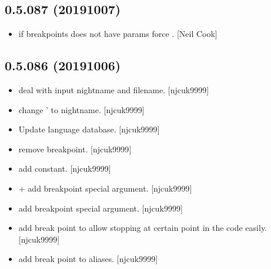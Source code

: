 \documentclass[a4paper,10pt,english]{report}
\begin{document}
\subsection{0.5.087 (2019\sphinxhyphen{}10\sphinxhyphen{}07)}
\label{\detokenize{misc/changelog:id75}}\begin{itemize}
\item {} 
 \sphinxhyphen{} if breakpoints does not have
params force . {[}Neil Cook{]}

\end{itemize}


\subsection{0.5.086 (2019\sphinxhyphen{}10\sphinxhyphen{}06)}
\label{\detokenize{misc/changelog:id76}}\begin{itemize}
\item {} 
 \sphinxhyphen{} deal with input nightname and
filename. {[}njcuk9999{]}

\item {} 
 \sphinxhyphen{} change ’ to nightname. {[}njcuk9999{]}

\item {} 
Update language database. {[}njcuk9999{]}

\item {} 
 \sphinxhyphen{} remove breakpoint. {[}njcuk9999{]}

\item {} 
 \sphinxhyphen{} add 
constant. {[}njcuk9999{]}

\item {} 
 +  \sphinxhyphen{} add breakpoint special
argument. {[}njcuk9999{]}

\item {} 
 \sphinxhyphen{} add breakpoint special argument.
{[}njcuk9999{]}

\item {} 
 \sphinxhyphen{} add break point to allow
stopping at certain point in the code easily. {[}njcuk9999{]}

\item {} 
 \sphinxhyphen{} add break point to aliases. {[}njcuk9999{]}

\end{itemize}
\end{document}
